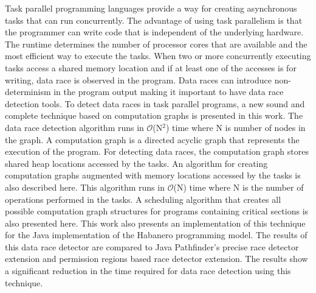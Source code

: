 Task parallel programming languages provide a way for creating asynchronous tasks that can run concurrently. The advantage of using task parallelism is that the programmer can write code that is independent of the underlying hardware. The runtime determines the number of processor cores that are available and the most efficient way to execute the tasks. When two or more concurrently executing tasks access a shared memory location and if at least one of the accesses is for writing, data race is observed in the program. Data races can introduce non-determinism in the program output making it important to have data race detection tools. To detect data races in task parallel programs, a new sound and complete technique based on computation graphs is presented in this work. The data race detection algorithm runs in $\mathcal{O}$(N$^2$) time where N is number of nodes in the graph. A computation graph is a directed acyclic graph that represents the execution of the program. For detecting data races, the computation graph stores shared heap locations accessed by the tasks. An algorithm for creating computation graphs augmented with memory locations accessed by the tasks is also described here. This algorithm runs in $\mathcal{O}$(N) time where N is the number of operations performed in the tasks. A scheduling algorithm that creates all possible computation graph structures for programs containing critical sections is also presented here. This work also presents an implementation of this technique for the Java implementation of the Habanero programming model. The results of this data race detector are compared to Java Pathfinder's precise race detector extension and permission regions based race detector extension. The results show a significant reduction in the time required for data race detection using this technique.